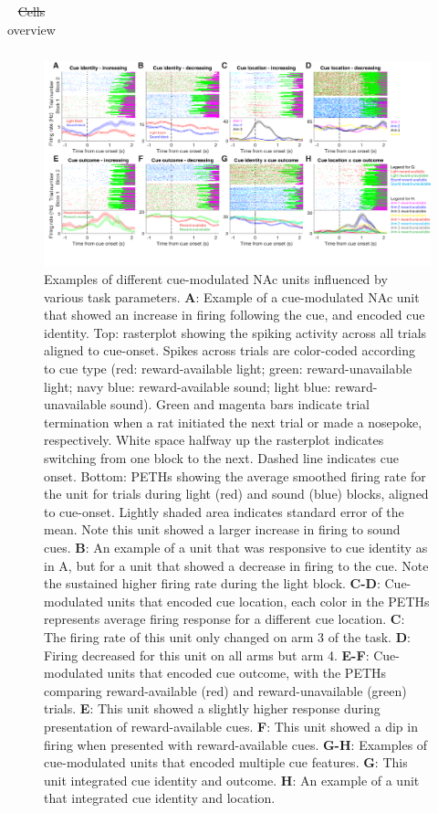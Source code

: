 \documentclass[11pt]{article}
\newcommand{\bsf}[1]{\textbf{#1}}
\providecommand{\DIFadd}[1]{{\protect\color{blue}\uwave{#1}}} %
\providecommand{\DIFdel}[1]{{\protect\color{red}\sout{#1}}}                      %
\providecommand{\DIFaddFL}[1]{\DIFadd{#1}} %
\providecommand{\DIFdelFL}[1]{\DIFdel{#1}} %
\providecommand{\DIFaddbeginFL}{} %
\providecommand{\DIFaddendFL}{} %
\providecommand{\DIFdelbeginFL}{} %
\providecommand{\DIFdelendFL}{} %
\newcommand{\DIFscaledelfig}{0.5}
\newlength{\DIFdelgraphicswidth} %
\newlength{\DIFdelgraphicsheight} %
\newcommand{\DIFaddincludegraphics}[2][]{{\color{blue}\fbox{\DIFOincludegraphics[#1]{#2}}}} %
\newcommand{\DIFdelincludegraphics}[2][]{%
\sbox{\DIFdelgraphicsbox}{\DIFOincludegraphics[#1]{#2}}%
\settoboxwidth{\DIFdelgraphicswidth}{\DIFdelgraphicsbox} %
\settoboxtotalheight{\DIFdelgraphicsheight}{\DIFdelgraphicsbox} %
\scalebox{\DIFscaledelfig}{%
\parbox[b]{\DIFdelgraphicswidth}{\usebox{\DIFdelgraphicsbox}\\[-\baselineskip] \rule{\DIFdelgraphicswidth}{0em}}\llap{\resizebox{\DIFdelgraphicswidth}{\DIFdelgraphicsheight}{%
\setlength{\unitlength}{\DIFdelgraphicswidth}%
\begin{picture}(1,1)%
\thicklines\linethickness{2pt} %
{\color[rgb]{1,0,0}\put(0,0){\framebox(1,1){}}}%
{\color[rgb]{1,0,0}\put(0,0){\line( 1,1){1}}}%
{\color[rgb]{1,0,0}\put(0,1){\line(1,-1){1}}}%
\end{picture}%
}\hspace*{3pt}}} %
} %
\DeclareRobustCommand{\DIFaddbeginFL}{\DIFOaddbeginFL \let\includegraphics\DIFaddincludegraphics} %
\DeclareRobustCommand{\DIFaddendFL}{\DIFOaddendFL \let\includegraphics\DIFOincludegraphics} %
\DeclareRobustCommand{\DIFdelbeginFL}{\DIFOdelbeginFL \let\includegraphics\DIFdelincludegraphics} %
\DeclareRobustCommand{\DIFdelendFL}{\DIFOaddendFL \let\includegraphics\DIFOincludegraphics} %
\begin{document}
{\begin{table}
\begin{tabular}{l c  c c c c}
\end{tabular}
\caption {\DIFdelbeginFL \DIFdelFL{Cells }\DIFdelendFL \DIFaddbeginFL \DIFaddFL{Units }\DIFaddendFL overview} \label{tbl1} 
\end{table}
\begin{figure}[h]
\centering
\includegraphics[width=\textwidth]{Fig 5 - Neural examples.png}
\caption{Examples of different cue-modulated NAc units influenced by various
  task parameters. \bsf{A}: Example of a cue-modulated NAc unit that showed an
  increase in firing following the cue, and encoded cue identity. Top:
  rasterplot showing the spiking activity across all trials aligned to
  cue-onset. Spikes across trials are color-coded according to cue type (red:
  reward-available light; green: reward-unavailable light; navy blue:
  reward-available sound; light blue: reward-unavailable sound). Green and
  magenta bars indicate trial termination when a rat initiated the next trial or
  made a nosepoke, respectively. White space halfway up the rasterplot indicates
  switching from one block to the next. Dashed line indicates cue onset. Bottom:
  PETHs showing the average smoothed firing rate for the unit for trials during
  light (red) and sound (blue) blocks, aligned to cue-onset. Lightly shaded area
  indicates standard error of the mean. Note this unit showed a larger increase
  in firing to sound cues. \bsf{B}: An example of a unit that was responsive to
  cue identity as in A, but for a unit that showed a decrease in firing to the
  cue. Note the sustained higher firing rate during the light block. \bsf{C-D}:
  Cue-modulated units that encoded cue location, each color in the PETHs
  represents average firing response for a different cue location. \bsf{C}: The
  firing rate of this unit only changed on arm 3 of the task. \bsf{D}: Firing
  decreased for this unit on all arms but arm 4. \bsf{E-F}: Cue-modulated units
  that encoded cue outcome, with the PETHs comparing reward-available (red) and
  reward-unavailable (green) trials. \bsf{E}: This unit showed a slightly higher
  response during presentation of reward-available cues. \bsf{F}: This unit
  showed a dip in firing when presented with reward-available cues. \bsf{G-H}:
  Examples of cue-modulated units that encoded multiple cue features. \bsf{G}:
  This unit integrated cue identity and outcome. \bsf{H}: An example of a unit
  that integrated cue identity and location.}
\label{fig:examples}
\end{figure}

}
\end{document}
